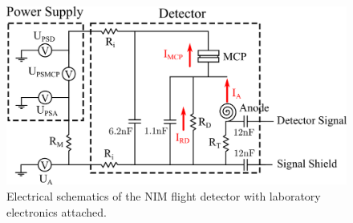 		\begin{figure}[h] %
			\centering
			\includegraphics[width = .8\textwidth]{Bilder/Detector_elec_schema.png}
			\caption{Electrical schematics of the NIM flight detector with laboratory electronics attached.}
			\label{fig:FlighElecSchema}
		\end{figure}
